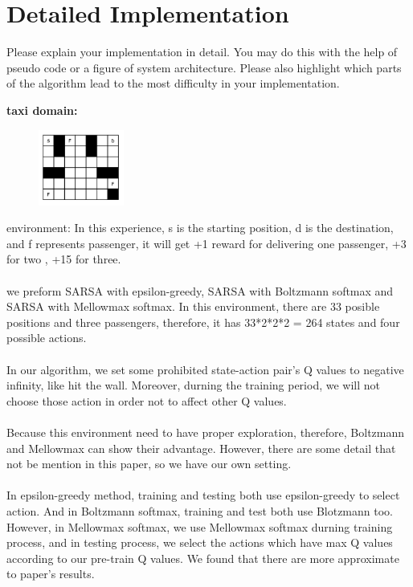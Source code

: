 \section{Detailed Implementation}
\label{section:implementation}
Please explain your implementation in detail. You may do this with the help of pseudo code or a figure of system architecture. Please also highlight which parts of the algorithm lead to the most difficulty in your implementation.


\textbf{taxi domain:}

\begin{figure}[htbp]
\includegraphics[width=0.25\textwidth]{taxi.png}
\end{figure}

environment:
In this experience, s is the starting position, d is the destination, and f represents passenger, it will get +1 reward for delivering one passenger, +3 for two , +15 for three.
\\
\\
we preform SARSA with epsilon-greedy, SARSA with Boltzmann softmax and SARSA with Mellowmax softmax. In this environment, there are 33 posible positions and three passengers, therefore, it has 33*2*2*2 = 264 states and four possible actions.
\\
\\
In our algorithm, we set some prohibited state-action pair's Q values to negative infinity, like hit the wall. Moreover, durning the training period, we will not choose those action in order not to affect other Q values.
\\
\\
Because this environment need to have proper exploration, therefore, Boltzmann and Mellowmax can show their advantage. However, there are some detail that not be mention in this paper, so we have our own setting.
\\
\\
In epsilon-greedy method, training and testing both use epsilon-greedy to select action. And in Boltzmann softmax, training and test both use Blotzmann too. However, in Mellowmax softmax, we use Mellowmax softmax durning training process, and in testing process, we select the actions which have max Q values according to our pre-train Q values. We found that there are more approximate to paper's results.